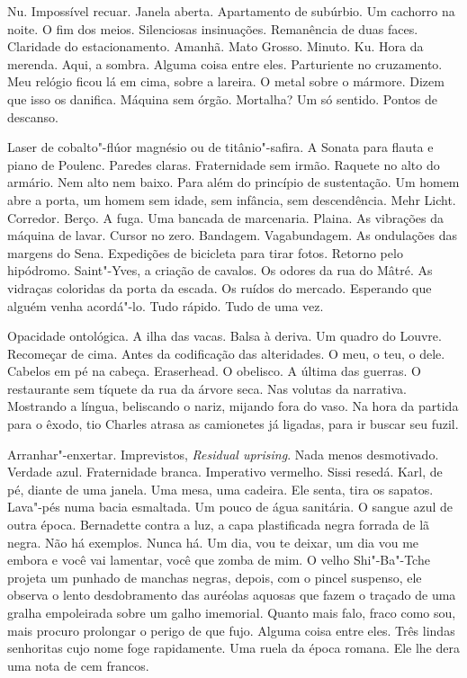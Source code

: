 Nu. Impossível recuar. Janela aberta. Apartamento de subúrbio. Um
cachorro na noite. O fim dos meios. Silenciosas insinuações. Remanência
de duas faces. Claridade do estacionamento. Amanhã. Mato Grosso. Minuto.
Ku. Hora da merenda. Aqui, a sombra. Alguma coisa entre eles.
Parturiente no cruzamento. Meu relógio ficou lá em cima, sobre a
lareira. O metal sobre o mármore. Dizem que isso os danifica. Máquina
sem órgão. Mortalha? Um só sentido. Pontos de descanso.

Laser de cobalto"-flúor magnésio ou de titânio"-safira. A Sonata para
flauta e piano de Poulenc. Paredes claras. Fraternidade sem irmão.
Raquete no alto do armário. Nem alto nem baixo. Para além do princípio
de sustentação. Um homem abre a porta, um homem sem idade, sem infância,
sem descendência. Mehr Licht. Corredor. Berço. A fuga. Uma bancada de
marcenaria. Plaina. As vibrações da máquina de lavar. Cursor no zero.
Bandagem. Vagabundagem. As ondulações das margens do Sena. Expedições de
bicicleta para tirar fotos. Retorno pelo hipódromo. Saint"-Yves, a
criação de cavalos. Os odores da rua do Mâtré. As vidraças coloridas da
porta da escada. Os ruídos do mercado. Esperando que alguém venha
acordá"-lo. Tudo rápido. Tudo de uma vez.

Opacidade ontológica. A ilha das vacas. Balsa à deriva. Um quadro do
Louvre. Recomeçar de cima. Antes da codificação das alteridades. O meu,
o teu, o dele. Cabelos em pé na cabeça. Eraserhead. O obelisco. A última
das guerras. O restaurante sem tíquete da rua da árvore seca. Nas
volutas da narrativa. Mostrando a língua, beliscando o nariz, mijando
fora do vaso. Na hora da partida para o êxodo, tio Charles atrasa as
camionetes já ligadas, para ir buscar seu fuzil.

Arranhar"-enxertar. Imprevistos, \emph{Residual uprising}. Nada menos
desmotivado. Verdade azul. Fraternidade branca. Imperativo vermelho.
Sissi resedá. Karl, de pé, diante de uma janela. Uma mesa, uma cadeira.
Ele senta, tira os sapatos. Lava"-pés numa bacia esmaltada. Um pouco de
água sanitária. O sangue azul de outra época. Bernadette contra a luz, a
capa plastificada negra forrada de lã negra. Não há exemplos. Nunca há.
Um dia, vou te deixar, um dia vou me embora e você vai lamentar, você %
que zomba de mim. O velho Shi"-Ba"-Tche projeta um punhado de manchas
negras, depois, com o pincel suspenso, ele observa o lento desdobramento
das auréolas aquosas que fazem o traçado de uma gralha empoleirada sobre
um galho imemorial. Quanto mais falo, fraco como sou, mais procuro
prolongar o perigo de que fujo. Alguma coisa entre eles. Três lindas
senhoritas cujo nome foge rapidamente. Uma ruela da época romana. Ele
lhe dera uma nota de cem francos.

